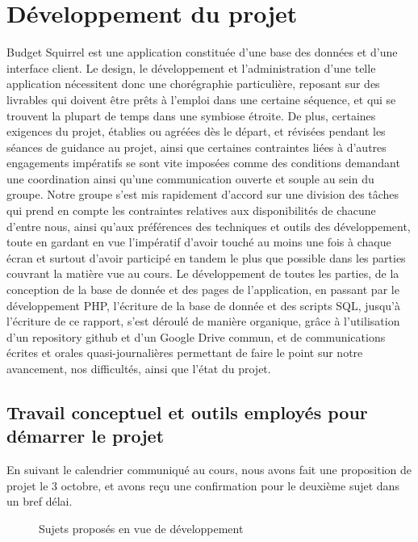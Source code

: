 \documentclass[a4paper,12pt]{article}
\begin{document}
\newpage

\section{Développement du projet}

Budget Squirrel est une application constituée d'une base des données et d'une interface client.
Le design, le développement et l'administration d'une telle application nécessitent donc une chorégraphie particulière, reposant sur des livrables qui doivent être prêts à l'emploi dans une certaine séquence, et qui se trouvent la plupart de temps dans une symbiose étroite.
De plus, certaines exigences du projet, établies ou agréées dès le départ, et révisées pendant les séances de guidance au projet, ainsi que certaines contraintes liées à d'autres engagements impératifs se sont vite imposées comme des conditions demandant une coordination ainsi qu'une communication ouverte et souple au sein du groupe.
Notre groupe s'est mis rapidement d'accord sur une division des tâches qui prend en compte les contraintes relatives aux disponibilités de chacune d'entre nous, ainsi qu'aux préférences des techniques et outils des développement, toute en gardant en vue l'impératif d'avoir touché au moins une fois à chaque écran et surtout d'avoir participé en tandem le plus que possible dans les parties couvrant la matière vue au cours.
Le développement de toutes les parties, de la conception de la base de donnée et des pages de l'application, en passant par le développement PHP, l'écriture de la base de donnée et des scripts SQL, jusqu'à l'écriture de ce rapport, s'est déroulé de manière organique, grâce à l'utilisation d'un repository github et d'un Google Drive commun, et de communications écrites et orales quasi-journalières permettant de faire le point sur notre avancement, nos difficultés, ainsi que l'état du projet.

\subsection{Travail conceptuel et outils employés pour démarrer le projet}

En suivant le calendrier communiqué au cours, nous avons fait une proposition de projet le 3 octobre, et avons reçu une confirmation pour le deuxième sujet dans un bref délai.

\begin{figure}[!ht]
\noindent
{}
\caption{\footnotesize{Sujets proposés en vue de développement}}
\end{figure}
\end{document}
